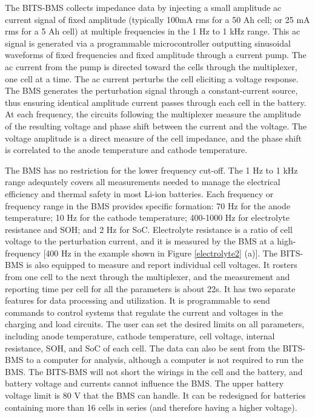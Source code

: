 \hspace{0.5cm}
The BITS-BMS collects impedance data by injecting a small amplitude ac current signal of fixed amplitude (typically 100mA rms for a 50 Ah cell; or 25 mA rms for a 5 Ah cell) at multiple frequencies in the 1 Hz to 1 kHz range. This ac signal is generated via a programmable microcontroller outputting sinusoidal waveforms of fixed frequencies and fixed amplitude through a current pump. The ac current from the pump is directed toward the cells through the multiplexer, one cell at a time. The ac current perturbs the cell eliciting a voltage response. The BMS generates the perturbation signal through a constant-current source, thus ensuring identical amplitude current passes through each cell in the battery. At each frequency, the circuits following the multiplexer measure the amplitude of the resulting voltage and phase shift between the current and the voltage. The voltage amplitude is a direct measure of the cell impedance, and the phase shift is correlated to the anode temperature and cathode temperature.

\vspace{0.5cm}
The BMS has no restriction for the lower frequency cut-off. The 1 Hz to 1 kHz range adequately covers all measurements needed to manage the electrical efficiency and thermal safety in most Li-ion batteries. Each frequency or frequency range in the BMS provides specific formation: 70 Hz for the anode temperature; 10 Hz for the cathode temperature; 400-1000 Hz for electrolyte resistance and SOH; and 2 Hz for SoC. Electrolyte resistance is a ratio of cell voltage to the perturbation current, and it is measured by the BMS at a high-frequency [400 Hz in the example shown in Figure \ref{electrolyte2} (a)]. The BITS-BMS is also equipped to measure and report individual cell voltages. It rosters from one cell to the next through the multiplexer, and the measurement and reporting time per cell for all the parameters is about 22s. It has two separate features for data processing and utilization. It is programmable to send commands to control systems that regulate the current and voltages in the charging and load circuits. The user can set the desired limits on all parameters, including anode temperature, cathode temperature, cell voltage, internal resistance, SOH, and SoC of each cell. The data can also be sent from the BITS-BMS to a computer for analysis, although a computer is not required to run the BMS. The BITS-BMS will not short the wirings in the cell and the battery, and battery voltage and currents cannot influence the BMS. The upper battery voltage limit is 80 V that the BMS can handle. It can be redesigned for batteries containing more than 16 cells in series (and therefore having a higher voltage).

